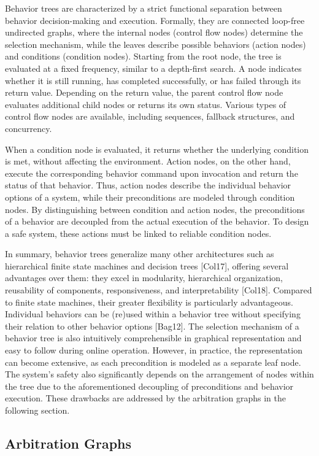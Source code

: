 Behavior trees are characterized by a strict functional separation between behavior decision-making and execution.
Formally, they are connected loop-free undirected graphs, where the internal nodes (control flow nodes) determine the selection mechanism, while the leaves describe possible behaviors (action nodes) and conditions (condition nodes).
Starting from the root node, the tree is evaluated at a fixed frequency, similar to a depth-first search.
A node indicates whether it is still running, has completed successfully, or has failed through its return value.
Depending on the return value, the parent control flow node evaluates additional child nodes or returns its own status.
Various types of control flow nodes are available, including sequences, fallback structures, and concurrency.

When a condition node is evaluated, it returns whether the underlying condition is met, without affecting the environment.
Action nodes, on the other hand, execute the corresponding behavior command upon invocation and return the status of that behavior.
Thus, action nodes describe the individual behavior options of a system, while their preconditions are modeled through condition nodes.
By distinguishing between condition and action nodes, the preconditions of a behavior are decoupled from the actual execution of the behavior.
To design a safe system, these actions must be linked to reliable condition nodes.

In summary, behavior trees generalize many other architectures such as hierarchical finite state machines and decision trees [Col17], offering several advantages over them: they excel in modularity, hierarchical organization, reusability of components, responsiveness, and interpretability [Col18].
Compared to finite state machines, their greater flexibility is particularly advantageous.
Individual behaviors can be (re)used within a behavior tree without specifying their relation to other behavior options [Bag12].
The selection mechanism of a behavior tree is also intuitively comprehensible in graphical representation and easy to follow during online operation.
However, in practice, the representation can become extensive, as each precondition is modeled as a separate leaf node.
The system's safety also significantly depends on the arrangement of nodes within the tree due to the aforementioned decoupling of preconditions and behavior execution.
These drawbacks are addressed by the arbitration graphs in the following section.

\subsection*{Arbitration Graphs}

